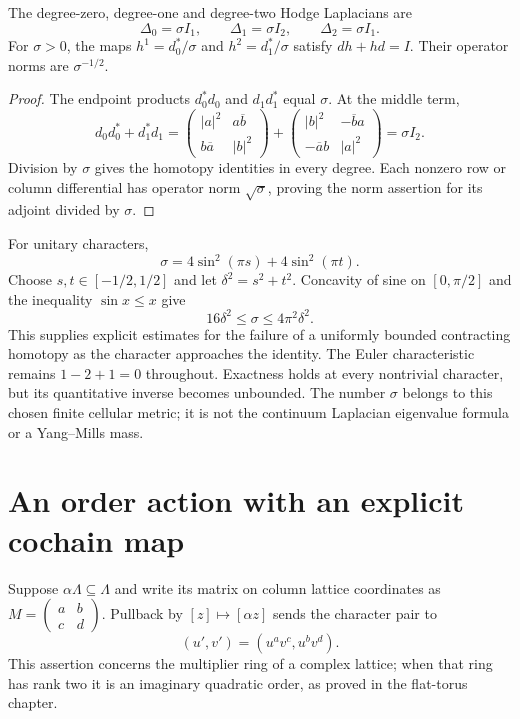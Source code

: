 \begin{proposition}
The degree-zero, degree-one and degree-two Hodge Laplacians are
\[
 \Delta_0=\sigma I_1,\qquad
 \Delta_1=\sigma I_2,\qquad
 \Delta_2=\sigma I_1.
\]
For $\sigma>0$, the maps $h^1=d_0^*/\sigma$ and
$h^2=d_1^*/\sigma$ satisfy $dh+hd=I$.  Their operator norms are
$\sigma^{-1/2}$.
\end{proposition}
\begin{proof}
The endpoint products $d_0^*d_0$ and $d_1d_1^*$ equal $\sigma$.
At the middle term,
\[
 d_0d_0^*+d_1^*d_1
 =\begin{pmatrix}|a|^2&a\overline b\\b\overline a&|b|^2\end{pmatrix}
 +\begin{pmatrix}|b|^2&-\overline b a\\-\overline a b&|a|^2\end{pmatrix}
 =\sigma I_2.
\]
Division by $\sigma$ gives the homotopy identities in every degree.
Each nonzero row or column differential has operator norm
$\sqrt\sigma$, proving the norm assertion for its adjoint divided by
$\sigma$.
\end{proof}

For unitary characters,
\[
 \sigma=4\sin^2(\pi s)+4\sin^2(\pi t).
\]
Choose $s,t\in[-1/2,1/2]$ and let $\delta^2=s^2+t^2$.  Concavity
of sine on $[0,\pi/2]$ and the inequality $\sin x\le x$ give
\[
 16\delta^2\le\sigma\le4\pi^2\delta^2.
\]
This supplies explicit estimates for the failure of a uniformly bounded
contracting homotopy as the character approaches the identity.  The Euler
characteristic remains $1-2+1=0$ throughout.  Exactness holds at every
nontrivial character, but its quantitative inverse becomes unbounded.
The number $\sigma$ belongs to this chosen finite cellular metric; it is
not the continuum Laplacian eigenvalue formula or a Yang--Mills mass.

\section{An order action with an explicit cochain map}

Suppose $\alpha\Lambda\subseteq\Lambda$ and write its matrix on column
lattice coordinates as
$M=\left(\begin{smallmatrix}a&b\\c&d\end{smallmatrix}\right)$.
Pullback by $[z]\mapsto[\alpha z]$ sends the character pair to
\begin{equation}
 (u',v')=(u^av^c,u^bv^d).
 \label{eq:character-monomial}
\end{equation}
This assertion concerns the multiplier ring of a complex lattice; when
that ring has rank two it is an imaginary quadratic order, as proved in
the flat-torus chapter.

